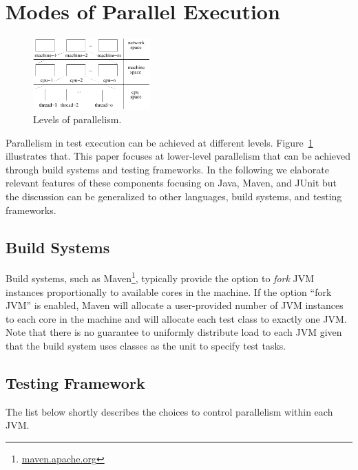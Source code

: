 \section{Modes of Parallel Execution}

\begin{figure}[t]
  \centering
  \includegraphics[width=0.4\textwidth]{figs/parallel-levels.pdf}
  \caption{\label{fig:levels}Levels of parallelism.}
\end{figure}

Parallelism in test execution can be achieved at different levels.
Figure~\ref{fig:levels} illustrates that.  This paper focuses
at lower-level parallelism that can be achieved through build systems
and testing frameworks.  In the following we elaborate relevant
features of these components focusing on Java, Maven, and JUnit but
the discussion can be generalized to other languages, build systems,
and testing frameworks.

\subsection{Build Systems}
Build systems, such as Maven\footnote{\url{maven.apache.org}},
typically provide the option to \emph{fork} JVM instances
proportionally to available cores in the machine.  If the option
``fork JVM'' is enabled, Maven will allocate a user-provided number of
JVM instances to each core in the machine and will allocate each test
class to exactly one JVM.  Note that there is no guarantee to
uniformly distribute load to each JVM given that the build system uses
classes as the unit to specify test tasks.

\subsection{Testing Framework}

The list below shortly describes the choices to control parallelism
within each JVM.

\newcommand{\Seq}{L0}
\newcommand{\ParClassSeqMeth}{L1}
\newcommand{\SeqClassParMeth}{L2}
\newcommand{\ParClassParMeth}{L3}

